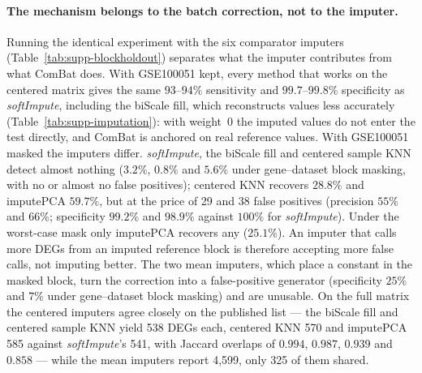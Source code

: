 \documentclass[11pt,a4paper]{article}
\begin{document}
\paragraph{The mechanism belongs to the batch correction, not to the imputer.}
Running the identical experiment with the six comparator
imputers (Table~\ref{tab:supp-blockholdout}) separates what the
imputer contributes from what ComBat does. With GSE100051
kept, every method that works on the centered matrix gives the
same $93$--$94\%$ sensitivity and $99.7$--$99.8\%$ specificity as
\textit{softImpute}, including the biScale fill, which
reconstructs values less accurately
(Table~\ref{tab:supp-imputation}): with weight~0 the imputed
values do not enter the test directly, and ComBat is anchored on
real reference values. With GSE100051 masked the imputers
differ. \textit{softImpute}, the biScale fill and centered sample
KNN detect almost nothing ($3.2\%$, $0.8\%$ and $5.6\%$ under
gene--dataset block masking, with no or almost no false
positives); centered KNN recovers $28.8\%$ and imputePCA $59.7\%$,
but at the price of 29 and 38 false positives (precision $55\%$
and $66\%$; specificity $99.2\%$ and $98.9\%$ against $100\%$
for \textit{softImpute}). Under the worst-case mask only
imputePCA recovers any ($25.1\%$). An imputer that calls more
DEGs from an imputed reference block is therefore accepting more
false calls, not imputing better. The two mean imputers, which
place a constant in the masked block, turn the correction into a
false-positive generator (specificity $25\%$ and $7\%$ under
gene--dataset block masking) and are unusable. On the full
matrix the centered imputers agree closely on the published list
--- the biScale fill and centered sample KNN yield 538 DEGs each,
centered KNN 570 and imputePCA 585 against \textit{softImpute}'s
541, with Jaccard overlaps of $0.994$, $0.987$, $0.939$ and
$0.858$ --- while the mean imputers report 4{,}599, only 325 of
them shared.
\end{document}
